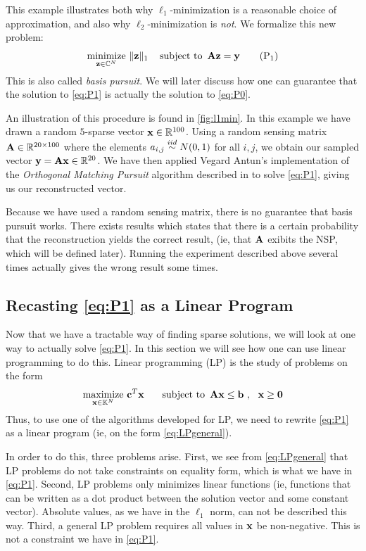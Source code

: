 This example illustrates both why $ \ell_{1} $-minimization is a reasonable choice of approximation, and also why $ \ell_{2} $-minimization is \textit{not}. We formalize this new problem:
\begin{equation}
	\underset{\mathbf{z} \in \mathbb{C}^{N}}{\text{minimize}}~ \lVert\mathbf{z}\rVert_1
	\quad\operatorname*{subject~to}~ \mathbf{A}\mathbf{z} = \mathbf{y}
	\tag{P$_1$}
	\label{eq:P1}
\end{equation}
This is also called \textit{basis pursuit}. We will later discuss how one can guarantee that the solution to \eqref{eq:P1} is actually the solution to \eqref{eq:P0}.

An illustration of this procedure is found in \cref{fig:l1min}. In this example we have drawn a random $ 5 $-sparse vector $ \mathbf{x} \in \mathbb{R}^{100} $. Using a random sensing matrix $ \mathbf{A} \in \mathbb{R}^{20\times 100} $ where the elements $ a_{i,j} \stackrel{iid}{\sim} N(0, 1) $ for all $ i,j $,  we obtain our sampled vector $ \mathbf{y} = \mathbf{A}\mathbf{x} \in\mathbb{R}^{20} $. We have then applied Vegard Antun's implementation of the \textit{Orthogonal Matching Pursuit} algorithm described in \cite[Section~3.2]{foucart13intro} to solve \eqref{eq:P1}, giving us our reconstructed vector.\nocite{antunAlgs}

Because we have used a random sensing matrix, there is no guarantee that basis pursuit works. There exists results which states that there is a certain probability that the reconstruction yields the correct result, (ie, that $ \mathbf{A} $ exibits the NSP, which will be defined later). Running the experiment described above several times actually gives the wrong result some times. 






\subsection{Recasting \eqref{eq:P1} as a Linear Program} \label{sec:basisasLP}
Now that we have a tractable way of finding sparse solutions, we will look at one way to actually solve \eqref{eq:P1}. In this section we will see how one can use linear programming to do this. Linear programming (LP) is the study of problems on the form
\begin{equation}
	\underset{\mathbf{x}\in\mathbb{K}^{N}}{\text{maximize}}~ \mathbf{c}^{T}\mathbf{x} ~~ \quad\operatorname*{subject~to}~ \mathbf{A}\mathbf{x}\leq\mathbf{b}~,~~ \mathbf{x}\geq\mathbf{0}
	\label{eq:LPgeneral}
\end{equation}
Thus, to use one of the algorithms developed for LP, we need to rewrite \eqref{eq:P1} as a linear program (ie, on the form \eqref{eq:LPgeneral}). 

In order to do this, three problems arise. First, we see from \cref{eq:LPgeneral} that LP problems do not take constraints on equality form, which is what we have in \eqref{eq:P1}. Second, LP problems only minimizes linear functions (ie, functions that can be written as a dot product between the solution vector and some constant vector). Absolute values, as we have in the $ \ell_{1} $ norm, can not be described this way. Third, a general LP problem requires all values in $ \mathbf{x} $ be non-negative. This is not a constraint we have in \eqref{eq:P1}.

